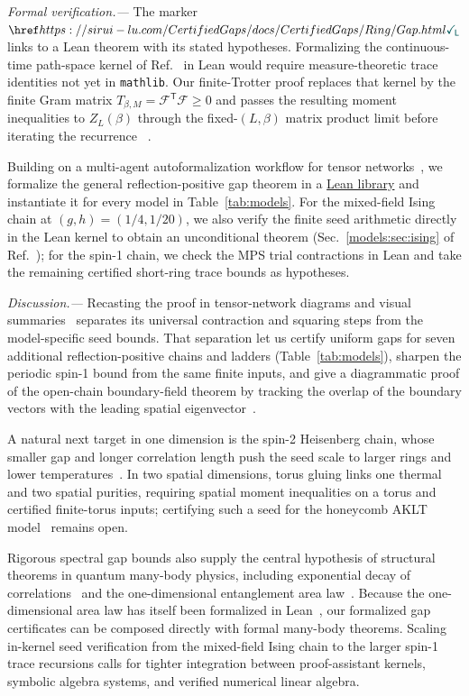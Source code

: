 \emph{Formal verification.---}
The marker $\leanmark{https://sirui-lu.com/CertifiedGaps/docs/CertifiedGaps/Ring/Gap.html}$
links to a Lean theorem with its stated hypotheses.
Formalizing the continuous-time path-space kernel of
Ref.~\cite{OpenAI2026Periodic} in Lean would require measure-theoretic
trace identities not yet in \texttt{mathlib}. Our finite-Trotter
proof replaces that kernel by the finite Gram matrix
$T_{\beta,M}=\mathcal F^{\mathsf T}\mathcal F\ge0$ and passes the
resulting moment inequalities to $Z_L(\beta)$ through the
fixed-$(L,\beta)$ matrix product limit before iterating the
recurrence%
~.

Building on a multi-agent autoformalization workflow for tensor
networks~\cite{Lu2026Multiagent,Lu2026TNLean}, we formalize the
general reflection-positive gap theorem in a
\href{https://github.com/LionSR/CertifiedGaps}{Lean library} and
instantiate it for every model in Table~\ref{tab:models}. For the
mixed-field Ising chain at $(g,h)=(1/4,1/20)$, we also verify the
finite seed arithmetic directly in the Lean kernel to obtain an
unconditional theorem (Sec.~\ref{models:sec:ising} of Ref.~\cite{SM});
for the spin-1 chain, we check the MPS trial contractions in Lean and
take the remaining certified short-ring trace bounds as hypotheses.

\emph{Discussion.---}
Recasting the proof in tensor-network diagrams and visual
summaries~\cite{Tufte1990Envisioning} separates its universal
contraction and squaring steps from the model-specific seed bounds.
That separation let us certify uniform gaps for seven additional
reflection-positive chains and ladders (Table~\ref{tab:models}),
sharpen the periodic spin-1 bound from the same finite inputs, and
give a diagrammatic proof of the open-chain boundary-field theorem by
tracking the overlap of the boundary vectors with the leading spatial
eigenvector~\cite{OpenAI2026Boundaryfield,SM}.

A natural next target in one dimension is the spin-2 Heisenberg
chain, whose smaller gap and longer correlation length push the seed
scale to larger rings and lower temperatures~\cite{Todo2001Cluster}.
In two spatial dimensions, torus gluing links one thermal and two
spatial purities, requiring spatial moment inequalities on a torus and
certified finite-torus inputs; certifying such a seed for the
honeycomb AKLT model~\cite{Lemm2020Existence,Pomata2020Demonstrating}
remains open.

Rigorous spectral gap bounds also supply the central hypothesis of
structural theorems in quantum many-body physics, including
exponential decay of correlations~\cite{Hastings2006Spectral} and the
one-dimensional entanglement area law~\cite{Hastings2007Area,Arad2013Area}.
Because the one-dimensional area law has itself been formalized in
Lean~\cite{Lu2026Multiagent,Lu2026TNLean}, our formalized gap
certificates can be composed directly with formal many-body theorems.
Scaling in-kernel seed verification from the mixed-field Ising chain
to the larger spin-1 trace recursions calls for tighter integration
between proof-assistant kernels, symbolic algebra systems, and
verified numerical linear algebra.
